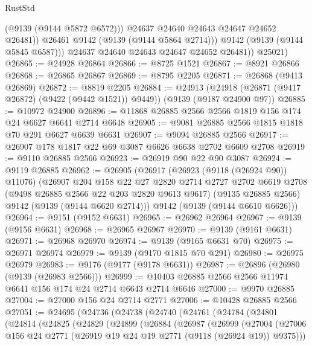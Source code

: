 \begin{lexlean}{RustStd}
\begin{coremodule}
                    (@9139 (@9144 @5872 @6572)))
                  @24637
                  @24640
                  @24643
                  @24647
                  @24652
                  @26481))
              @26461
              @9142
              (@9139 (@9144 @5864 @2714)))
            @9142
            (@9139 (@9144 @5845 @6587)))
          @24637
          @24640
          @24643
          @24647
          @24652
          @26481))
      @25021)
@26865 := @24928 @26864
@26866 := @8725 @1521
@26867 := @8921 @26866
@26868 := @26865 @26867
@26869 := @8795 @2205
@26871 := @26868 (@9413 @26869)
@26872 := @8819 @2205
@26884 := @24913
    (@24918 (@26871 (@9417 @26872) (@9422 (@9442 @1521)) @9449))
    (@9139 (@9187 @24900 @97))
@26885 := @10972 @24900
@26896 := @11868 @26885 @2566 @2566 @1819 @156 @174 @24 @6627 @6641 @2714 @6648
@26905 := @9081 @26885 @2566 @1815 @1818 @70 @291 @6627 @6639 @6631
@26907 := @9094 @26885 @2566
@26917 := @26907 @178 @1817 @22 @69 @3087 @6626 @6638 @2702 @6609 @2708
@26919 := @9110 @26885 @2566
@26923 := @26919 @90 @22 @90 @3087
@26924 := @9119 @26885
@26962 := @26905
    (@26917
      (@26923 (@9118 (@26924 @90)) @11076)
      (@26907
        @204
        @158
        @22
        @27
        @2820
        @2714
        @2727
        @2702
        @6619
        @2708
        (@9498 @26885 @2566 @22 @203 @2820 @9613 @9617)
        (@9135 @26885 @2566)
        @9142
        (@9139 (@9144 @6620 @2714)))
      @9142
      (@9139 (@9144 @6610 @6626)))
@26964 := @9151 (@9152 @6631)
@26965 := @26962 @26964
@26967 := @9139 (@9156 @6631)
@26968 := @26965 @26967
@26970 := @9139 (@9161 @6631)
@26971 := @26968 @26970
@26974 := @9139 (@9165 @6631 @70)
@26975 := @26971 @26974
@26979 := @9139 (@9170 @1815 @70 @291)
@26980 := @26975 @26979
@26983 := @9176 (@9177 (@9178 @6631))
@26987 := @26896 (@26980 (@9139 (@26983 @2566)))
@26999 := @10403 @26885 @2566 @2566 @11974 @6641 @156 @174 @24 @2714 @6643 @2714 @6646
@27000 := @9970 @26885
@27004 := @27000 @156 @24 @2714 @2771
@27006 := @10428 @26885 @2566
@27051 := @24695
    (@24736
      (@24738
        (@24740
          (@24761
            (@24784
              (@24801
                (@24814
                  (@24825
                    (@24829
                      (@24899
                        (@26884
                          (@26987
                            (@26999
                              (@27004
                                (@27006
                                  @156
                                  @24
                                  @2771
                                  (@26919 @19 @24 @19 @2771 (@9118 (@26924 @19)) @9375)))

\end{coremodule}
\end{lexlean}
